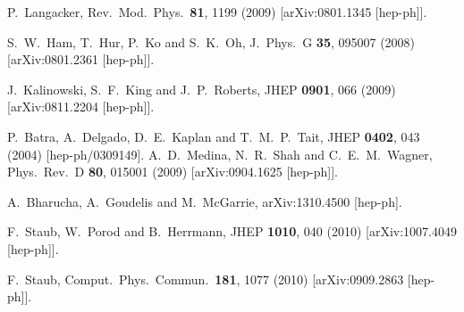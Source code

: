 \documentclass[final,3p,11pt,pdflatex]{elsarticle}
\begin{document}
\begin{thebibliography}{100}
  P.~Langacker,
  Rev.\ Mod.\ Phys.\  {\bf 81}, 1199 (2009)
  [arXiv:0801.1345 [hep-ph]].

  S.~W.~Ham, T.~Hur, P.~Ko and S.~K.~Oh,
  J.\ Phys.\ G {\bf 35}, 095007 (2008)
  [arXiv:0801.2361 [hep-ph]].


  J.~Kalinowski, S.~F.~King and J.~P.~Roberts,
  JHEP {\bf 0901}, 066 (2009)
  [arXiv:0811.2204 [hep-ph]].

  P.~Batra, A.~Delgado, D.~E.~Kaplan and T.~M.~P.~Tait,
  JHEP {\bf 0402}, 043 (2004)
  [hep-ph/0309149].
  A.~D.~Medina, N.~R.~Shah and C.~E.~M.~Wagner,
  Phys.\ Rev.\ D {\bf 80}, 015001 (2009)
  [arXiv:0904.1625 [hep-ph]].

  A.~Bharucha, A.~Goudelis and M.~McGarrie,
  arXiv:1310.4500 [hep-ph].

  F.~Staub, W.~Porod and B.~Herrmann,
  JHEP {\bf 1010}, 040 (2010)
  [arXiv:1007.4049 [hep-ph]].

  F.~Staub,
  Comput.\ Phys.\ Commun.\  {\bf 181}, 1077 (2010)
  [arXiv:0909.2863 [hep-ph]].


\end{thebibliography}
\end{document}
